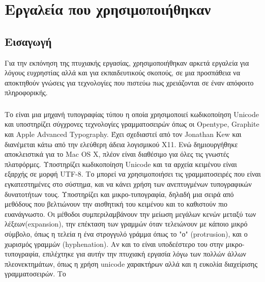 \chapter{Εργαλεία που χρησιμοποιήθηκαν}
\section{Εισαγωγή}
Για την εκπόνηση της πτυχιακής εργασίας, χρησιμοποιήθηκαν αρκετά εργαλεία για λόγους ευχρηστίας αλλά και για εκπαιδευτικούς σκοπούς, σε μια προσπάθεια να αποκτηθούν γνώσεις για τεχνολογίες που πιστεύω πως χρειάζονται σε έναν απόφοιτο πληροφορικής.\\
\subsection{}
Το  είναι μια μηχανή τυπογραφίας τύπου  η οποία χρησιμοποιεί κωδικοποίηση Unicode και υποστηρίζει σύγχρονες τεχνολογίες γραμματοσειρών όπως οι Opentype, Graphite και Apple Advanced Typography. Έχει σχεδιαστεί από τον Jonathan Kew και διανέμεται κάτω από την ελεύθερη άδεια λογισμικού X11. Ενώ δημιουργήθηκε αποκλειστικά για το Mac OS X, πλέον είναι διαθέσιμο για όλες τις γνωστές πλατφόρμες. Υποστηρίζει κωδικοποίηση Unicode και τα αρχεία κειμένου είναι εξαρχής σε μορφή UTF-8. Το  μπορεί να χρησιμοποιήσει τις γραμματοσειρές που είναι εγκατεστημένες στο σύστημα, και να κάνει χρήση των ανεπτυγμένων τυπογραφικών δυνατοτήτων τους. Υποστηρίζει και μικρο-τυπογραφία, δηλαδή μια σειρά από μεθόδους που βελτιώνουν την αισθητική του κειμένου και το καθιστούν πιο ευανάγνωστο. Οι μέθοδοι συμπεριλαμβάνουν την μείωση μεγάλων κενών μεταξύ των λέξεων(expansion), την επέκταση των γραμμών όταν τελειώνουν με κάποιο μικρό σύμβολο, όπως η τελεία η ένα στρογγυλό γράμμα όπως το "ο" (protrusion), και ο χωρισμός γραμμών (hyphenation). Αν και το  είναι υποδεέστερο του  στην μικρο-τυπογραφία, επιλέχτηκε για αυτήν την πτυχιακή εργασία λόγω των πολλών άλλων πλεονεκτημάτων, όπως η χρήση unicode χαρακτήρων αλλά και η ευκολία διαχείρισης γραμματοσειρών. Το  

